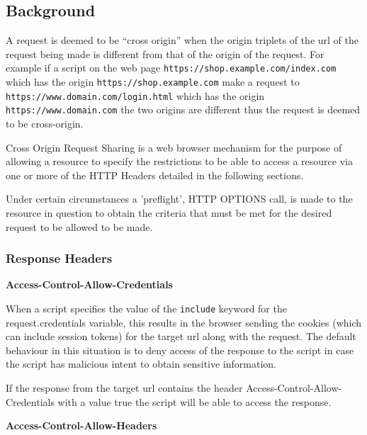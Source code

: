 \documentclass{mscreport}
\begin{document}
\subsection{Background}

A request is deemed to be ``cross origin'' when the origin triplets of the url of the request being made is different from that of the origin of the request. For example if a script on the web page \texttt{https://shop.example.com/index.com} which has the origin \texttt{https://shop.example.com} make a request to \texttt{https://www.domain.com/login.html} which has the origin \texttt{https://www.domain.com} the two origins are different thus the request is deemed to be cross-origin.

\vspace{0.3cm} \noindent
Cross Origin Request Sharing is a web browser mechanism for the purpose of allowing a resource to specify the restrictions to be able to access a resource via one or more of the HTTP Headers \cite{Apple2006-hk} detailed in the following sections.

\vspace{0.3cm} \noindent
Under certain circumstances a 'preflight', HTTP OPTIONS call, is made to the resource in question to obtain the criteria that must be met for the desired request to be allowed to be made.

\subsubsection{Response Headers}

\textbf{Access-Control-Allow-Credentials}

\vspace{0.3cm} \noindent
When a script specifies the value of the \texttt{include} keyword for the request.credentials variable, this results in the browser sending the cookies (which can include session tokens) for the target url along with the request. The default behaviour in this situation is to deny access of the response to the script in case the script has malicious intent to obtain sensitive information.

\vspace{0.3cm} \noindent
If the response from the target url contains the header Access-Control-Allow-Credentials with a value true the script will be able to access the response.

\vspace{0.7cm} \noindent
\textbf{Access-Control-Allow-Headers}
\end{document}
